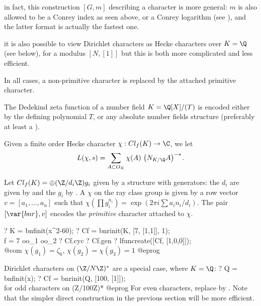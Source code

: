 \item in fact, this construction $[G, m]$ describing a character
is more general: $m$ is also allowed to be a Conrey index as seen above,
or a Conrey logarithm (see ), and the latter format is
actually the fastest one.

\item it is also possible to view Dirichlet characters as Hecke characters
over $K = \Q$ (see below), for a modulus $[N, [1]]$ but this is both more
complicated and less efficient.

In all cases, a non-primitive character is replaced by the attached primitive
character.


The Dedekind zeta function of a number field $K = \Q[X]/(T)$ is encoded
either by the defining polynomial $T$, or any absolute number fields
structure (preferably at least a ).

Given a finite order Hecke character $\chi: Cl_f(K)\to \C$, we let
$$L(\chi, s) = \sum_{A \subset O_K} \chi(A)\, \left(N_{K/\Q}A\right)^{-s}.$$

Let $Cl_f(K) = \oplus (\Z/d_i\Z) g_i$ given by a  structure with
generators: the $d_i$ are given by  and the $g_i$ by .
A  $\chi$ on the ray class group is given by a row vector
$v = [a_1,\ldots,a_n]$ such that $\chi(\prod g_i^{n_i}) = \exp(2\pi i\sum
a_i n_i / d_i)$. The pair $[\var{bnr}, v]$ encodes the \emph{primitive}
character attached to $\chi$.

\bprog
? K  = bnfinit(x^2-60);
? Cf = bnrinit(K, [7, [1,1]], 1); \\ f = 7 oo_1 oo_2
? Cf.cyc
? Cf.gen
? lfuncreate([Cf, [1,0,0]]); \\@com $\chi(g_1) = \zeta_6$, $\chi(g_2)=\chi(g_3)=1$
@eprog

\noindent Dirichlet characters on $(\Z/N\Z)^*$ are a special case,
where $K = \Q$:
\bprog
? Q  = bnfinit(x);
? Cf = bnrinit(Q, [100, [1]]); \\ for odd characters on (Z/100Z)*
@eprog\noindent
For even characters, replace by . Note that the simpler
direct construction in the previous section will be more efficient.


